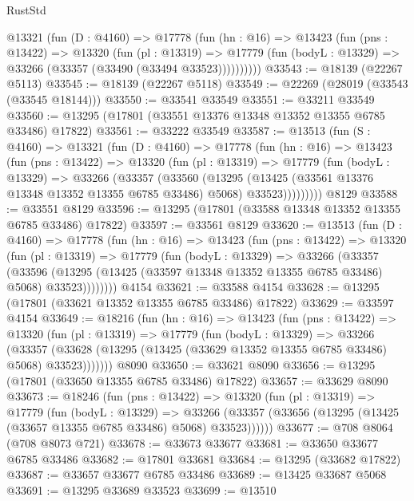 \begin{lexlean}{RustStd}
\begin{coremodule}
      @13321
        (fun (D : @4160) =>
        @17778
          (fun (hn : @16) =>
          @13423
            (fun (pns : @13422) =>
            @13320
              (fun (pl : @13319) =>
              @17779 (fun (bodyL : @13329) => @33266 (@33357 (@33490 (@33494 @33523))))))))))
@33543 := @18139 (@22267 @5113)
@33545 := @18139 (@22267 @5118)
@33549 := @22269 (@28019 (@33543 (@33545 @18144)))
@33550 := @33541 @33549
@33551 := @33211 @33549
@33560 := @13295 (@17801 (@33551 @13376 @13348 @13352 @13355 @6785 @33486) @17822)
@33561 := @33222 @33549
@33587 := @13513
    (fun (S : @4160) =>
    @13321
      (fun (D : @4160) =>
      @17778
        (fun (hn : @16) =>
        @13423
          (fun (pns : @13422) =>
          @13320
            (fun (pl : @13319) =>
            @17779
              (fun (bodyL : @13329) =>
              @33266
                (@33357
                  (@33560
                    (@13295
                      (@13425 (@33561 @13376 @13348 @13352 @13355 @6785 @33486) @5068)
                      @33523)))))))))
    @8129
@33588 := @33551 @8129
@33596 := @13295 (@17801 (@33588 @13348 @13352 @13355 @6785 @33486) @17822)
@33597 := @33561 @8129
@33620 := @13513
    (fun (D : @4160) =>
    @17778
      (fun (hn : @16) =>
      @13423
        (fun (pns : @13422) =>
        @13320
          (fun (pl : @13319) =>
          @17779
            (fun (bodyL : @13329) =>
            @33266
              (@33357
                (@33596
                  (@13295 (@13425 (@33597 @13348 @13352 @13355 @6785 @33486) @5068) @33523))))))))
    @4154
@33621 := @33588 @4154
@33628 := @13295 (@17801 (@33621 @13352 @13355 @6785 @33486) @17822)
@33629 := @33597 @4154
@33649 := @18216
    (fun (hn : @16) =>
    @13423
      (fun (pns : @13422) =>
      @13320
        (fun (pl : @13319) =>
        @17779
          (fun (bodyL : @13329) =>
          @33266
            (@33357 (@33628 (@13295 (@13425 (@33629 @13352 @13355 @6785 @33486) @5068) @33523)))))))
    @8090
@33650 := @33621 @8090
@33656 := @13295 (@17801 (@33650 @13355 @6785 @33486) @17822)
@33657 := @33629 @8090
@33673 := @18246
    (fun (pns : @13422) =>
    @13320
      (fun (pl : @13319) =>
      @17779
        (fun (bodyL : @13329) =>
        @33266 (@33357 (@33656 (@13295 (@13425 (@33657 @13355 @6785 @33486) @5068) @33523))))))
@33677 := @708 @8064 (@708 @8073 @721)
@33678 := @33673 @33677
@33681 := @33650 @33677 @6785 @33486
@33682 := @17801 @33681
@33684 := @13295 (@33682 @17822)
@33687 := @33657 @33677 @6785 @33486
@33689 := @13425 @33687 @5068
@33691 := @13295 @33689 @33523
@33699 := @13510

\end{coremodule}
\end{lexlean}
